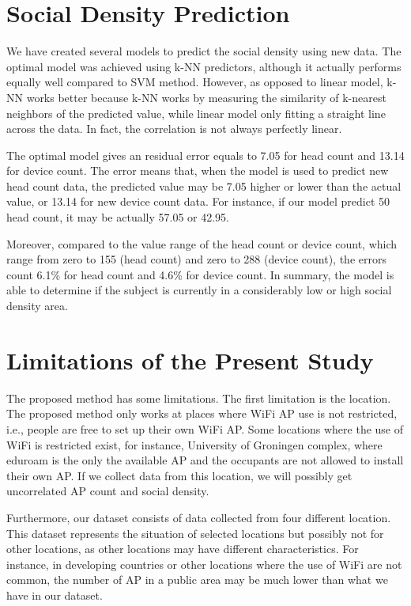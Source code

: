\section{Social Density Prediction} %
\label{sec:social_density_prediction}
We have created several models to predict the social density using new data. The optimal model was achieved using \ac{k-NN} predictors, although it actually performs equally well compared to \ac{SVM} method. However, as opposed to linear model, \ac{k-NN} works better because \ac{k-NN} works by measuring the similarity of k-nearest neighbors of the predicted value, while linear model only fitting a straight line across the data. In fact, the correlation is not always perfectly linear.

The optimal model gives an residual error equals to 7.05 for head count and 13.14 for device count. The error means that, when the model is used to predict new head count data, the predicted value may be 7.05 higher or lower than the actual value, or 13.14 for new device count data. For instance, if our model predict 50 head count, it may be actually 57.05 or 42.95.

Moreover, compared to the value range of the head count or device count, which range from zero to 155 (head count) and zero to 288 (device count), the errors count 6.1\% for head count and 4.6\% for device count. In summary, the model is able to determine if the subject is currently in a considerably low or high social density area.

\section{Limitations of the Present Study}
\label{sec:limitation_of_the_present_study}
The proposed method has some limitations.
The first limitation is the location. The proposed method only works at places where WiFi \ac{AP} use is not restricted, i.e., people are free to set up their own WiFi AP. Some locations where the use of WiFi is restricted exist, for instance, University of Groningen complex, where eduroam is the only the available AP and the occupants are not allowed to install their own AP. If we collect data from this location, we will possibly get uncorrelated \ac{AP} count and social density.

Furthermore, our dataset consists of data collected from four different location. This dataset represents the situation of selected locations but possibly not for other locations, as other locations may have different characteristics. For instance, in developing countries or other locations where the use of WiFi are not common, the number of \ac{AP} in a public area may be much lower than what we have in our dataset.

